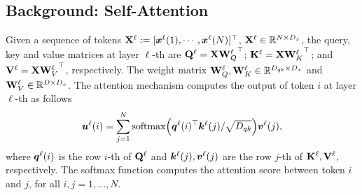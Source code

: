 \subsection{Background: Self-Attention}
\label{sec:background}
Given a sequence of tokens ${\mathbf X}^{\ell}:=[{\bm x}^{\ell}(1),\cdots,{\bm x}^{\ell}(N)]^\top$, ${\mathbf X}^\ell \in {\mathbb{R}}^{N\times D_x}$, the query, key and value matrices at layer $\ell$-th are ${\mathbf Q}^{\ell}={\mathbf X}{{\mathbf W}_Q^{\ell}}^\top$; ${\mathbf K}^{\ell}={\mathbf X}{{\mathbf W}_K^{\ell}}^\top$; and ${\mathbf V}^{\ell}={\mathbf X}{{\mathbf W}_V^{\ell}}^\top$, respectively. The weight matrix ${\mathbf W}^{\ell}_Q, {\mathbf W}^{\ell}_K \in {\mathbb{R}}^{D_{qk}\times D_x}$ and ${\mathbf W}^{\ell}_V\in {\mathbb{R}}^{D\times D_x}$. The attention mechanism computes the output of token $i$ at layer $\ell$-th as follows
\begin{equation}
\label{eq:attention-vec}
{{{\bm u}}^{\ell}}(i)=\sum_{j=1}^N{\rm softmax}\Big({{\bm q}^{\ell}}(i)^\top{{\bm k}^{\ell}}(j)/\sqrt{D_{qk}}\Big){{\bm v}^{\ell}}(j),
\end{equation}
where ${{\bm q}^{\ell}}(i)$ is the row $i$-th of ${\mathbf Q}^{\ell}$ and ${{\bm k}^{\ell}}(j), {{\bm v}^{\ell}}(j)$ are the row $j$-th of ${\mathbf K}^{\ell}, {\mathbf V}^{\ell}$, respectively.
The softmax function computes the attention score between token $i$ and $j$, for all $i, j = 1, \dots, N$.
